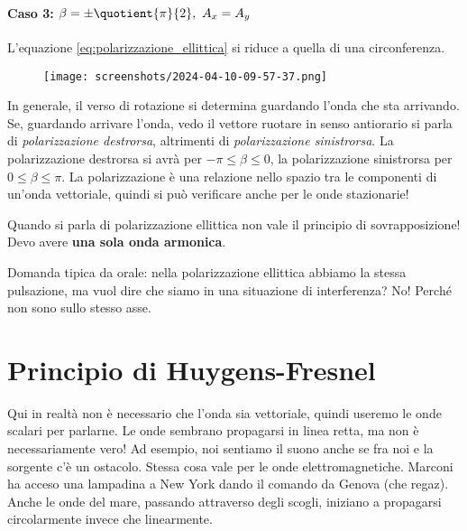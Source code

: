 \paragraph{Caso 3: \(\beta =\pm \quotient{\pi }{2},\ A_x=A_y \)}
L'equazione \eqref{eq:polarizzazione_ellittica} si riduce a quella di una circonferenza.
\begin{figure}[H]
	\centering
	\texttt{[image: screenshots/2024-04-10-09-57-37.png]}
\end{figure}
In generale, il verso di rotazione si determina guardando l'onda che sta arrivando. Se, guardando arrivare l'onda, vedo il vettore ruotare in senso antiorario si parla di \emph{polarizzazione destrorsa}, altrimenti di \emph{polarizzazione sinistrorsa}. La polarizzazione destrorsa si avrà per \(-\pi \leq \beta \leq 0\), la polarizzazione sinistrorsa per \(0\leq \beta \leq \pi \). La polarizzazione è una relazione nello spazio tra le componenti di un'onda vettoriale, quindi si può verificare anche per le onde stazionarie!
\begin{remark}
	Quando si parla di polarizzazione ellittica non vale il principio di sovrapposizione! Devo avere \textbf{una sola onda armonica}. 
\end{remark}

\begin{note}
	Domanda tipica da orale: nella polarizzazione ellittica abbiamo la stessa pulsazione, ma vuol dire che siamo in una situazione di interferenza? No! Perché non sono sullo stesso asse.
\end{note}

\section{Principio di Huygens-Fresnel}
Qui in realtà non è necessario che l'onda sia vettoriale, quindi useremo le onde scalari per parlarne. Le onde sembrano propagarsi in linea retta, ma non è necessariamente vero! Ad esempio, noi sentiamo il suono anche se fra noi e la sorgente c'è un ostacolo. Stessa cosa vale per le onde elettromagnetiche. Marconi ha acceso una lampadina a New York dando il comando da Genova (che regaz). Anche le onde del mare, passando attraverso degli scogli, iniziano a propagarsi circolarmente invece che linearmente.

